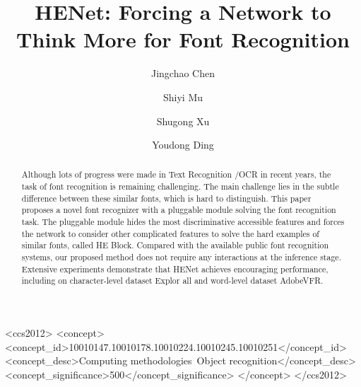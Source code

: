 \documentclass[manuscript,screen]{acmart}
\begin{document}
\title{HENet: Forcing a Network to Think More for Font Recognition}


\author{Jingchao Chen}

\author{Shiyi Mu}


\author{Shugong Xu}

\author{Youdong Ding}



\renewcommand{\shortauthors}{Chen, et al.}


\begin{abstract}
Although lots of progress were made in Text Recognition
/OCR in recent years, the task of font recognition is remaining challenging.  The main challenge lies in the subtle difference between these similar fonts, which is hard to distinguish. This paper proposes a novel font recognizer with a pluggable module solving the font recognition task. The pluggable module hides the most discriminative accessible features and forces the network to consider other complicated features to solve the hard examples of similar fonts, called HE Block. Compared with the available public font recognition systems, our proposed method does not require any interactions at the inference stage. Extensive experiments demonstrate that HENet achieves encouraging performance, including on character-level dataset Explor all and word-level dataset AdobeVFR.
\end{abstract}

\begin{CCSXML}
<ccs2012>
<concept>
<concept_id>10010147.10010178.10010224.10010245.10010251</concept_id>
<concept_desc>Computing methodologies~Object recognition</concept_desc>
<concept_significance>500</concept_significance>
</concept>
</ccs2012>
\end{CCSXML}

\end{document}
